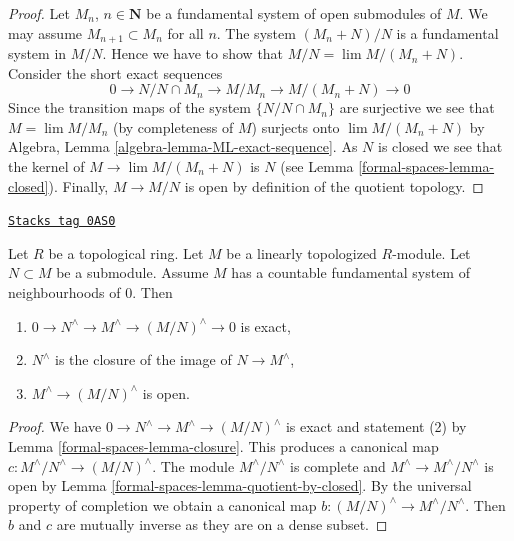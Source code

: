 \begin{proof}
Let $M_n$, $n \in \mathbf{N}$ be a fundamental system of open submodules of $M$.
We may assume $M_{n + 1} \subset M_n$
for all $n$. The system $(M_n + N)/N$ is a fundamental system in $M/N$.
Hence we have to show that $M/N = \lim M/(M_n + N)$. Consider
the short exact sequences
$$
0 \to N/N \cap M_n \to M/M_n \to M/(M_n + N) \to 0
$$
Since the transition maps of the system $\{N/N\cap M_n\}$ are surjective
we see that $M = \lim M/M_n$ (by completeness of $M$) surjects onto
$\lim M/(M_n + N)$ by
Algebra, Lemma \ref{algebra-lemma-ML-exact-sequence}.
As $N$ is closed we see that the kernel of $M \to \lim M/(M_n + N)$
is $N$ (see Lemma \ref{formal-spaces-lemma-closed}). Finally, $M \to M/N$
is open by definition of the quotient topology.
\end{proof}

\begin{lemma}[Ses]
\label{formal-spaces-lemma-ses}
\href{https://stacks.math.columbia.edu/tag/0AS0}{\texttt{Stacks tag 0AS0}}

\begin{reference}
\cite[Theorem 8.1]{Ma}
\end{reference}
Let $R$ be a topological ring. Let $M$ be a linearly topologized
$R$-module. Let $N \subset M$ be a submodule. Assume $M$ has a
countable fundamental system of neighbourhoods of $0$. Then
\begin{enumerate}
\item $0 \to N^\wedge \to M^\wedge \to (M/N)^\wedge \to 0$ is exact,
\item $N^\wedge$ is the closure of the image of $N \to M^\wedge$,
\item $M^\wedge \to (M/N)^\wedge$ is open.
\end{enumerate}
\end{lemma}

\begin{proof}
We have $0 \to N^\wedge \to M^\wedge \to (M/N)^\wedge$ is exact
and statement (2) by Lemma \ref{formal-spaces-lemma-closure}.
This produces a canonical map $c : M^\wedge/N^\wedge \to (M/N)^\wedge$.
The module $M^\wedge/N^\wedge$ is complete and
$M^\wedge \to M^\wedge/N^\wedge$ is open by
Lemma \ref{formal-spaces-lemma-quotient-by-closed}.
By the universal property of completion we obtain a canonical
map $b : (M/N)^\wedge \to M^\wedge/N^\wedge$.
Then $b$ and $c$ are mutually inverse as they are on a dense subset.
\end{proof}


